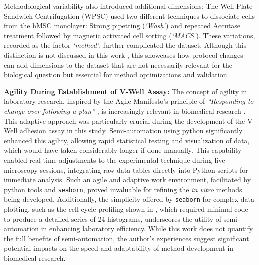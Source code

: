 Methodological variability also introduced additional dimensions: The Well Plate
Sandwich Centrifugation (WPSC) used two different techniques to dissociate
\MAina cells from the hMSC monolayer: Strong pipetting
(\emph{`Wash'}) and repeated Accutase treatment followed by magnetic activated
cell sorting (\emph{`MACS'}). These variations, recorded as the factor
\textit{`method'}, further complicated the dataset. Although this distinction is
not discussed in this work , this
showcases how protocol changes can add dimensions to the dataset that are
not necessarily relevant for the biological question but essential for
method optimizations and validation.



\textbf{Agility During Establishment of V-Well Assay:}
The concept of agility in laboratory research, inspired by the Agile Manifesto's
principle of \emph{``Responding to change over following a plan''}
\cite{ManifestoAgileSoftware2001}, is increasingly relevant in biomedical
research \cite{westReinventingResearchAgile2018,quanbeckApplyingConceptsRapid2022}. This adaptive approach was
particularly crucial during the development of the V-Well adhesion assay in this
study. Semi-automation using python significantly enhanced this agility,
allowing rapid statistical testing and visualization of data, which would have
taken considerably longer if done manually. This capability enabled real-time
adjustments to the experimental technique during live microscopy sessions,
integrating raw data tables directly into Python scripts for immediate analysis.
Such an agile and adaptive work environment, facilitated by python tools and
\texttt{seaborn}, proved invaluable for refining the \textit{in vitro} methods
being developed. Additionally, the simplicity offered by \texttt{seaborn} for
complex data plotting, such as the cell cycle profiling shown in
, which required minimal code to produce a
detailed series of 24 histograms, underscores the utility of semi-automation in
enhancing laboratory efficiency. While this work does not quantify the full
benefits of semi-automation, the author's experiences suggest significant
potential impacts on the speed and adaptability of method development in
biomedical research.





